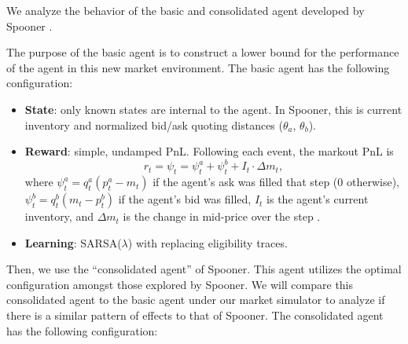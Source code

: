 \documentclass{article}
\begin{document}
We analyze the behavior of the basic and consolidated agent developed by Spooner \citep{spooner2018}.

The purpose of the basic agent is to construct a lower bound for the performance of the agent in this new market environment. The basic agent has the following configuration:

\begin{itemize}
  \item \textbf{State}: only known states are internal to the agent. In Spooner, this is current inventory and normalized bid/ask quoting distances ($\theta_a$, $\theta_b$).
  \item \textbf{Reward}: simple, undamped PnL. Following each event, the markout PnL is
    \begin{equation}
    r_t = \psi_t = \psi_t^{a} + \psi_t^{b} + I_t \cdot \Delta m_t,
    \end{equation}
    where $\psi_t^{a} = q_t^{a}(p_t^{a} - m_t)$ if the agent's ask was filled that step (0 otherwise), $\psi_t^{b} = q_t^{b}(m_t - p_t^{b})$ if the agent's bid was filled, $I_t$ is the agent's current inventory, and $\Delta m_t$ is the change in mid-price over the step \citep{spooner2018}.
  \item \textbf{Learning}: SARSA($\lambda$) with replacing eligibility traces.
\end{itemize}

Then, we use the ``consolidated agent'' of Spooner. This agent utilizes the optimal configuration amongst those explored by Spooner. We will compare this consolidated agent to the basic agent under our market simulator to analyze if there is a similar pattern of effects to that of Spooner. The consolidated agent has the following configuration:
\end{document}
